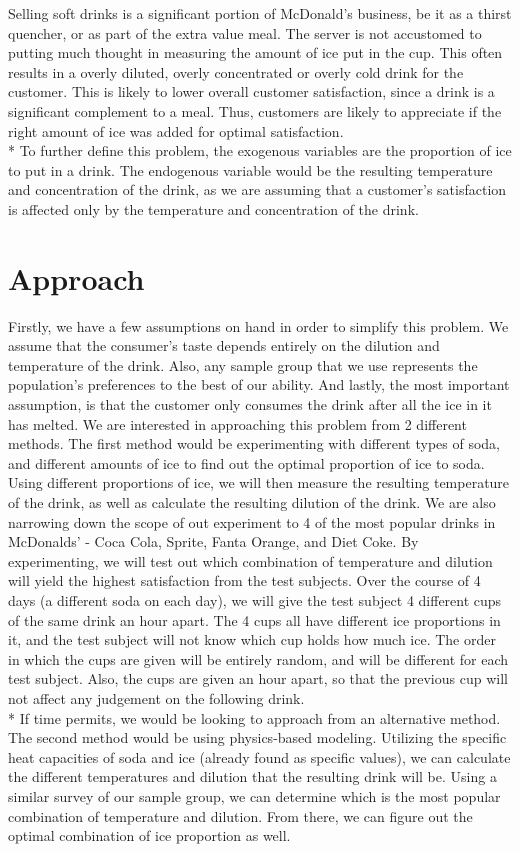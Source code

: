 \documentclass[12pt,letterpaper]{article}
\theoremstyle{definition}
\begin{document}
Selling soft drinks is a significant portion of McDonald's business, be it as a thirst quencher, or as part of the extra value meal. The server is not accustomed to putting much thought in measuring the amount of ice put in the cup. This often results in a overly diluted, overly concentrated or overly cold drink for the customer. This is likely to lower overall customer satisfaction, since a drink is a significant complement to a meal. Thus, customers are likely to appreciate if the right amount of ice was added for optimal satisfaction.
\\* To further define this problem, the exogenous variables are the proportion of ice to put in a drink. The endogenous variable would be the resulting temperature and concentration of the drink, as we are assuming that a customer's satisfaction is affected only by the temperature and concentration of the drink.

\section{Approach}
Firstly, we have a few assumptions on hand in order to simplify this problem. We assume that the consumer's taste depends entirely on the dilution and temperature of the drink. Also, any sample group that we use represents the population's preferences to the best of our ability. And lastly, the most important assumption, is that the customer only consumes the drink after all the ice in it has melted.
We are interested in approaching this problem from 2 different methods. The first method would be experimenting with different types of soda, and different amounts of ice to find out the optimal proportion of ice to soda. Using different proportions of ice, we will then measure the resulting temperature of the drink, as well as calculate the resulting dilution of the drink. We are also narrowing down the scope of out experiment to 4 of the most popular drinks in McDonalds' - Coca Cola, Sprite, Fanta Orange, and Diet Coke. By experimenting, we will test out which combination of temperature and dilution will yield the highest satisfaction from the test subjects. Over the course of 4 days (a different soda on each day), we will give the test subject 4 different cups of the same drink an hour apart. The 4 cups all have different ice proportions in it, and the test subject will not know which cup holds how much ice. The order in which the cups are given will be entirely random, and will be different for each test subject. Also, the cups are given an hour apart, so that the previous cup will not affect any judgement on the following drink.
\\* If time permits, we would be looking to approach from an alternative method. The second method would be using physics-based modeling. Utilizing the specific heat capacities of soda and ice (already found as specific values), we can calculate the different temperatures and dilution that the resulting drink will be. Using a similar survey of our sample group, we can determine which is the most popular combination of temperature and dilution. From there, we can figure out the optimal combination of ice proportion as well.
\end{document}
